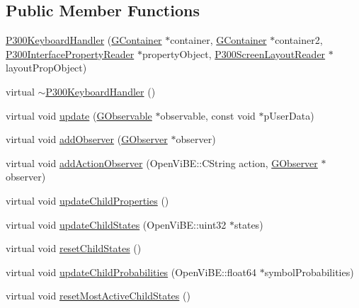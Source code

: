 \subsection*{Public Member Functions}
\begin{DoxyCompactItemize}
\item 
\hyperlink{classOpenViBEApplications_1_1P300KeyboardHandler_a2c546b532c8027e58e1d92bfa90725bf}{P300KeyboardHandler} (\hyperlink{classOpenViBEApplications_1_1GContainer}{GContainer} $\ast$container, \hyperlink{classOpenViBEApplications_1_1GContainer}{GContainer} $\ast$container2, \hyperlink{classOpenViBEApplications_1_1P300InterfacePropertyReader}{P300InterfacePropertyReader} $\ast$propertyObject, \hyperlink{classOpenViBEApplications_1_1P300ScreenLayoutReader}{P300ScreenLayoutReader} $\ast$layoutPropObject)
\item 
virtual \hyperlink{classOpenViBEApplications_1_1P300KeyboardHandler_a1a73858b58e29867eacf0efe3a055625}{$\sim$P300KeyboardHandler} ()
\item 
virtual void \hyperlink{classOpenViBEApplications_1_1P300KeyboardHandler_a89578d0bd9802e87f0c82066c6cb5c77}{update} (\hyperlink{classOpenViBEApplications_1_1GObservable}{GObservable} $\ast$observable, const void $\ast$pUserData)
\item 
virtual void \hyperlink{classOpenViBEApplications_1_1P300KeyboardHandler_abc75584b55a59ca0731ccedd94a5d14d}{addObserver} (\hyperlink{classOpenViBEApplications_1_1GObserver}{GObserver} $\ast$observer)
\item 
virtual void \hyperlink{classOpenViBEApplications_1_1P300KeyboardHandler_a09d41e4e8a8e560e001c482f61c756f9}{addActionObserver} (OpenViBE::CString action, \hyperlink{classOpenViBEApplications_1_1GObserver}{GObserver} $\ast$observer)
\item 
virtual void \hyperlink{classOpenViBEApplications_1_1P300KeyboardHandler_abc59edd655f91e7a03a5a0fc8cb56963}{updateChildProperties} ()
\item 
virtual void \hyperlink{classOpenViBEApplications_1_1P300KeyboardHandler_ad7ee4d1491a579744ea1e31c54de3a95}{updateChildStates} (OpenViBE::uint32 $\ast$states)
\item 
virtual void \hyperlink{classOpenViBEApplications_1_1P300KeyboardHandler_a4e10715137c1355048f3cea9f6e3fa31}{resetChildStates} ()
\item 
virtual void \hyperlink{classOpenViBEApplications_1_1P300KeyboardHandler_aea3770d3869fd2039f6d701e915a71cc}{updateChildProbabilities} (OpenViBE::float64 $\ast$symbolProbabilities)
\item 
virtual void \hyperlink{classOpenViBEApplications_1_1P300KeyboardHandler_a0df195cacfb10e16e0ad155c790093fb}{resetMostActiveChildStates} ()
\end{DoxyCompactItemize}
